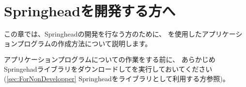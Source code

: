 \newpage
\section{Springheadを開発する方へ}
\label{sec:ForDevelopper}

\noindent
この章では、Springheadの開発を行なう方のために、
\cmake を使用したアプリケーションプログラムの作成方法について説明します。

\medskip
\noindent
アプリケーションプログラムについての作業をする前に、
あらかじめSpringehadライブラリをダウンロードして\cmake を実行しておいてください
(\UpKQs\ref{sec:ForNonDevelopper} Springheadをライブラリとして利用する方\UpKQe 参照)。

